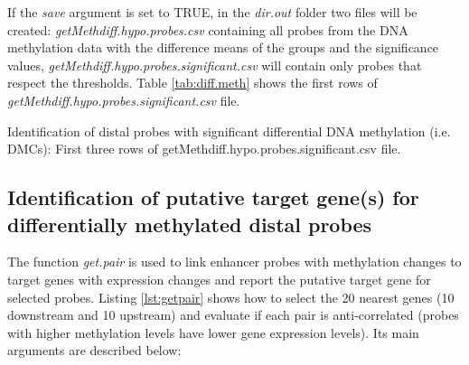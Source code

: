 If the \textit{save} argument is set to TRUE, in the \textit{dir.out} folder two files will be created: \textit{getMethdiff.hypo.probes.csv} containing all probes from the DNA methylation data with the difference means of the groups and the significance values, \textit{getMethdiff.hypo.probes.significant.csv} will contain only probes that respect the thresholds. Table \ref{tab:diff.meth} shows the first rows of  \textit{getMethdiff.hypo.probes.significant.csv} file.

\begin{table}[h!]
\caption[Identification of distal probes with significant differential DNA methylation (i.e. DMCs)]{Identification of distal probes with significant differential DNA methylation (i.e. DMCs): First three rows of  getMethdiff.hypo.probes.significant.csv file. }
\label{tab:diff.meth}
\end{table}

\newpage
\subsection*{Identification of putative target gene(s) for differentially methylated distal probes}
The function \textit{get.pair} is used to link enhancer probes with methylation changes to target genes with expression changes and report the putative target gene for selected probes. Listing \ref{lst:getpair} shows how to select the 20 nearest genes (10 downstream and 10 upstream) and evaluate if each pair is anti-correlated (probes with higher methylation levels have lower gene expression levels).
Its main arguments are described below:


